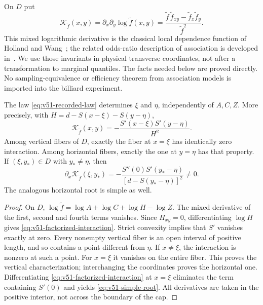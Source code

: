 On $D$ put
\begin{equation}\label{eq:v51-interaction}
 \mathcal K_{\widetilde f}(x,y)
   =\partial_x\partial_y\log\widetilde f(x,y)
   =\frac{\widetilde f\,\widetilde f_{xy}
                       -\widetilde f_x\widetilde f_y}{\widetilde f^2}.
\end{equation}
This mixed logarithmic derivative is the classical local dependence
function of Holland and Wang~\cite{HollandWang1987}; the related
odds-ratio description of association is developed in~\cite{Osius2009}.
We use those invariants in physical transverse coordinates, not after a
transformation to marginal quantiles.  The facts needed below are proved
directly.  No sampling-equivalence or efficiency theorem from association
models is imported into the billiard experiment.

\begin{lemma}
\label{lem:v51-origins}
The law \eqref{eq:v51-recorded-law} determines $\xi$ and $\eta$, independently
of $A,C,Z$.  More precisely, with $H=d-S(x-\xi)-S(y-\eta)$,
\begin{equation}\label{eq:v51-factorized-interaction}
 \mathcal K_{\widetilde f}(x,y)
       =-\frac{S'(x-\xi)S'(y-\eta)}{H^2}.
\end{equation}
Among vertical fibers of $D$, exactly the fiber at $x=\xi$ has identically
zero interaction.  Among horizontal fibers, exactly the one at $y=\eta$
has that property.  If $(\xi,y_*)\in D$ with $y_*\ne\eta$, then
\begin{equation}\label{eq:v51-simple-root}
 \partial_x\mathcal K_{\widetilde f}(\xi,y_*)
 =-\frac{S''(0)S'(y_*-\eta)}{[d-S(y_*-\eta)]^2}\ne0.
\end{equation}
The analogous horizontal root is simple as well.
\end{lemma}

\begin{proof}
On $D$, $\log\widetilde f=\log A+\log C+\log H-\log Z$.
The mixed derivative of the first, second and fourth terms vanishes.
Since $H_{xy}=0$, differentiating $\log H$ gives
\eqref{eq:v51-factorized-interaction}.  Strict convexity implies that
$S'$ vanishes exactly at zero.  Every nonempty vertical fiber is an open
interval of positive length, and so contains a point different from
$\eta$.  If $x\ne\xi$, the interaction is nonzero at such a point.
For $x=\xi$ it vanishes on the entire fiber.  This proves the vertical
characterization; interchanging the coordinates proves the horizontal
one.  Differentiating \eqref{eq:v51-factorized-interaction} at $x=\xi$
eliminates the term containing $S'(0)$ and yields
\eqref{eq:v51-simple-root}.  All derivatives are taken in the positive
interior, not across the boundary of the cap.
\end{proof}

